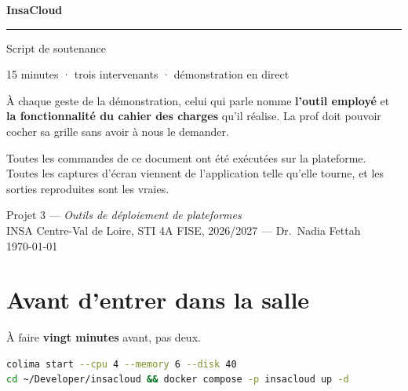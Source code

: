 \documentclass[a4paper,11pt,oneside]{report}
\begin{document}
\begin{titlepage}
\centering
\vspace*{2.5cm}

{\Huge\bfseries InsaCloud\par}
\vspace{6pt}
{\color{insared}\rule{4cm}{2pt}\par}
\vspace{18pt}
{\LARGE Script de soutenance\par}
\vspace{8pt}
{\large 15 minutes · trois intervenants · démonstration en direct\par}

\vspace{2cm}
\begin{minipage}{0.84\textwidth}
\color{gristexte}\small
À chaque geste de la démonstration, celui qui parle nomme \textbf{l'outil
employé} et \textbf{la fonctionnalité du cahier des charges} qu'il réalise. La
prof doit pouvoir cocher sa grille sans avoir à nous le demander.

\medskip
Toutes les commandes de ce document ont été exécutées sur la plateforme. Toutes
les captures d'écran viennent de l'application telle qu'elle tourne, et les
sorties reproduites sont les vraies.
\end{minipage}

\vfill
{\color{gristexte}\small
Projet 3 --- \textit{Outils de déploiement de plateformes}\\
INSA Centre-Val de Loire, STI 4A FISE, 2026/2027 --- Dr.~Nadia Fettah\\[8pt]
\today\par}
\end{titlepage}

\setcounter{tocdepth}{0}
\tableofcontents
\cleardoublepage
{}

\chapter*{Avant d'entrer dans la salle}

À faire \textbf{vingt minutes} avant, pas deux.

\begin{lstlisting}[language=bash]
colima start --cpu 4 --memory 6 --disk 40
cd ~/Developer/insacloud && docker compose -p insacloud up -d
\end{lstlisting}
\end{document}
